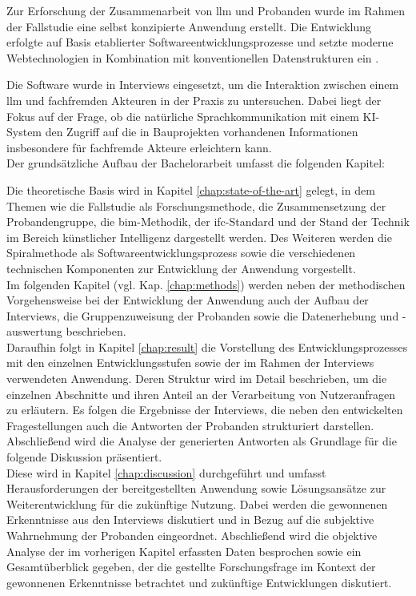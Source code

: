 Zur Erforschung der Zusammenarbeit von \gls{llm} und Probanden wurde im Rahmen der Fallstudie eine selbst konzipierte Anwendung erstellt.
Die Entwicklung erfolgte auf Basis etablierter Softwareentwicklungsprozesse und setzte moderne Webtechnologien in Kombination mit konventionellen Datenstrukturen ein \cite{boehm1988spiralmodel,hunt2013whydidwebuildreact,nestjsUnknownDocumentation,postgresqlUnknownDocs}.

Die Software wurde in Interviews eingesetzt, um die Interaktion zwischen einem \gls{llm} und fachfremden Akteuren in der Praxis zu untersuchen.
Dabei liegt der Fokus auf der Frage, ob die natürliche Sprachkommunikation mit einem KI-System den Zugriff auf die in Bauprojekten vorhandenen Informationen insbesondere für fachfremde Akteure erleichtern kann. \\

Der grundsätzliche Aufbau der Bachelorarbeit umfasst die folgenden Kapitel:

Die theoretische Basis wird in Kapitel \ref{chap:state-of-the-art} gelegt, in dem Themen wie die Fallstudie als Forschungsmethode, die Zusammensetzung der Probandengruppe, die \gls{bim}-Methodik, der \gls{ifc}-Standard und der Stand der Technik im Bereich künstlicher Intelligenz dargestellt werden.
Des Weiteren werden die Spiralmethode als Softwareentwicklungsprozess sowie die verschiedenen technischen Komponenten zur Entwicklung der Anwendung vorgestellt. \\

Im folgenden Kapitel (vgl. Kap. \ref{chap:methods}) werden neben der methodischen Vorgehensweise bei der Entwicklung der Anwendung auch der Aufbau der Interviews, die Gruppenzuweisung der Probanden sowie die Datenerhebung und -auswertung beschrieben. \\

Daraufhin folgt in Kapitel \ref{chap:result} die Vorstellung des Entwicklungsprozesses mit den einzelnen Entwicklungsstufen sowie der im Rahmen der Interviews verwendeten Anwendung.
Deren Struktur wird im Detail beschrieben, um die einzelnen Abschnitte und ihren Anteil an der Verarbeitung von Nutzeranfragen zu erläutern.
Es folgen die Ergebnisse der Interviews, die neben den entwickelten Fragestellungen auch die Antworten der Probanden strukturiert darstellen.
Abschließend wird die Analyse der generierten Antworten als Grundlage für die folgende Diskussion präsentiert. \\

Diese wird in Kapitel \ref{chap:discussion} durchgeführt und umfasst Herausforderungen der bereitgestellten Anwendung sowie Lösungsansätze zur Weiterentwicklung für die zukünftige Nutzung.
Dabei werden die gewonnenen Erkenntnisse aus den Interviews diskutiert und in Bezug auf die subjektive Wahrnehmung der Probanden eingeordnet.
Abschließend wird die objektive Analyse der im vorherigen Kapitel erfassten Daten besprochen sowie ein Gesamtüberblick gegeben, der die gestellte Forschungsfrage im Kontext der gewonnenen Erkenntnisse betrachtet und zukünftige Entwicklungen diskutiert. \\